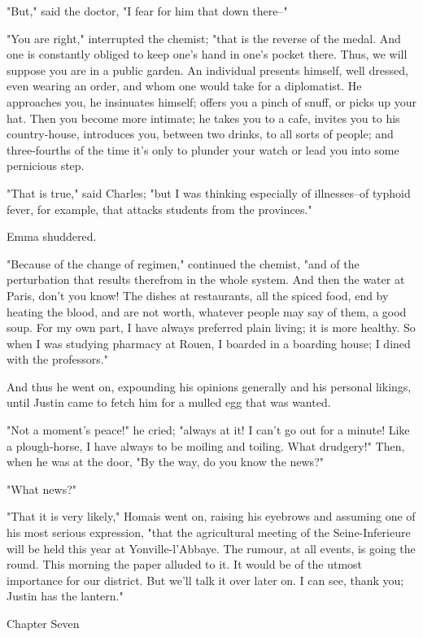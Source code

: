 \documentclass[11pt,twocolumn]{ltugboat}
\begin{document}
"But," said the doctor, "I fear for him that down there--"

"You are right," interrupted the chemist; "that is the reverse of the
medal. And one is constantly obliged to keep one's hand in one's pocket
there. Thus, we will suppose you are in a public garden. An individual
presents himself, well dressed, even wearing an order, and whom one
would take for a diplomatist. He approaches you, he insinuates himself;
offers you a pinch of snuff, or picks up your hat. Then you become more
intimate; he takes you to a cafe, invites you to his country-house,
introduces you, between two drinks, to all sorts of people; and
three-fourths of the time it's only to plunder your watch or lead you
into some pernicious step.

"That is true," said Charles; "but I was thinking especially of
illnesses--of typhoid fever, for example, that attacks students from the
provinces."

Emma shuddered.

"Because of the change of regimen," continued the chemist, "and of the
perturbation that results therefrom in the whole system. And then the
water at Paris, don't you know! The dishes at restaurants, all the
spiced food, end by heating the blood, and are not worth, whatever
people may say of them, a good soup. For my own part, I have always
preferred plain living; it is more healthy. So when I was studying
pharmacy at Rouen, I boarded in a boarding house; I dined with the
professors."

And thus he went on, expounding his opinions generally and his personal
likings, until Justin came to fetch him for a mulled egg that was
wanted.

"Not a moment's peace!" he cried; "always at it! I can't go out for a
minute! Like a plough-horse, I have always to be moiling and toiling.
What drudgery!" Then, when he was at the door, "By the way, do you know
the news?"

"What news?"

"That it is very likely," Homais went on, raising his eyebrows and
assuming one of his most serious expression, "that the agricultural
meeting of the Seine-Inferieure will be held this year at
Yonville-l'Abbaye. The rumour, at all events, is going the round. This
morning the paper alluded to it. It would be of the utmost importance
for our district. But we'll talk it over later on. I can see, thank you;
Justin has the lantern."



Chapter Seven
\end{document}
